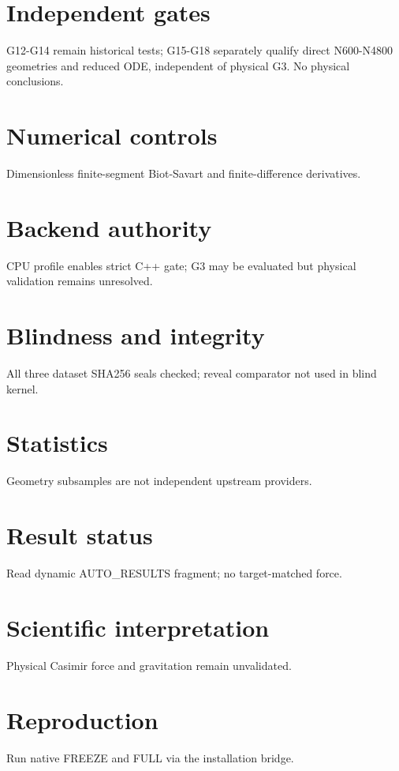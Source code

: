 \documentclass[10pt,a4paper]{article}
\begin{document}
\section{Independent gates}
G12-G14 remain historical tests; G15-G18 separately qualify direct N600-N4800 geometries and reduced ODE, independent of physical G3. No physical conclusions.
\section{Numerical controls}
Dimensionless finite-segment Biot-Savart and finite-difference derivatives.
\section{Backend authority}
CPU profile enables strict C++ gate; G3 may be evaluated but physical validation remains unresolved.
\section{Blindness and integrity}
All three dataset SHA256 seals checked; reveal comparator not used in blind kernel.
\section{Statistics}
Geometry subsamples are not independent upstream providers.
\section{Result status}
Read dynamic AUTO\_RESULTS fragment; no target-matched force.

\section{Scientific interpretation}
Physical Casimir force and gravitation remain unvalidated.
\section{Reproduction}
Run native FREEZE and FULL via the installation bridge.
\end{document}
